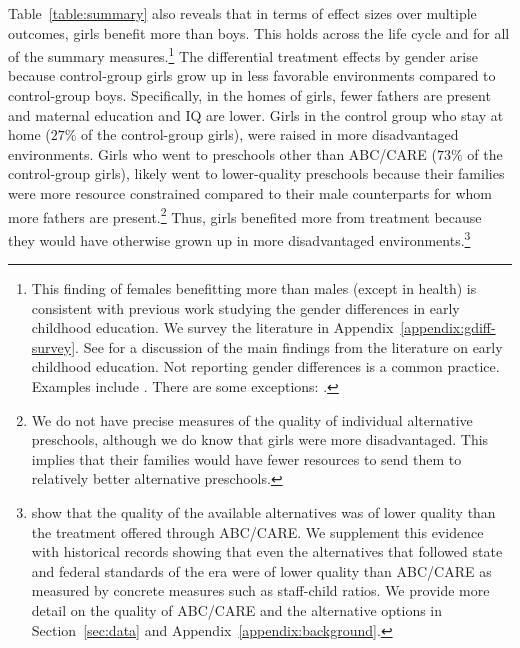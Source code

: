 Table~\ref{table:summary} also reveals that in terms of effect sizes over multiple outcomes, girls benefit more than boys. This holds across the life cycle and for all of the summary measures.\footnote{This finding of females benefitting more than males (except in health) is consistent with previous work studying the gender differences in early childhood education. We survey the literature in Appendix~\ref{appendix:gdiff-survey}. See \citet{Elango_Hojman_etal_2016_Early-Edu} for a discussion of the main findings from the literature on early childhood education. Not reporting gender differences is a common practice. Examples include \citet{Bernal_Keane_2011_JoLE,Cascio_Schanzenbach_2013_ImpactsExpandingAccess,Bitler_et_al_2014_Head_Start_Unpublished,Kline_Walters_2016_QJE}. There are some exceptions: \citet{Anderson_2008_JASA,Heckman_Moon_etal_2010_QE,Campbell_Conti_etal_2014_EarlyChildhoodInvestments,Garcia_Heckman_Leaf_etal_2017_Comp_CBA_Unpublished}.} The differential treatment effects by gender arise because control-group girls grow up in less favorable environments compared to control-group boys. Specifically, in the homes of girls, fewer fathers are present and maternal education and IQ are lower. Girls in the control group who stay at home ($27\%$ of the control-group girls), were raised in more disadvantaged environments. Girls who went to preschools other than ABC/CARE ($73\%$ of the control-group girls), likely went to lower-quality preschools because their families were more resource constrained compared to their male counterparts for whom more fathers are present.\footnote{We do not have precise measures of the quality of individual alternative preschools, although we do know that girls were more disadvantaged. This implies that their families would have fewer resources to send them to relatively better alternative preschools.} Thus, girls benefited more from treatment because they would have otherwise grown up in more disadvantaged environments.\footnote{\citet{Burchinal_etal_1989_CD_Daycare-Pre-K-Dev} show that the quality of the available alternatives was of lower quality than the treatment offered through ABC/CARE. We supplement this evidence with historical records showing that even the alternatives that followed state and federal standards of the era were of lower quality than ABC/CARE as measured by concrete measures such as staff-child ratios. We provide more detail on the quality of ABC/CARE and the alternative options in Section~\ref{sec:data} and Appendix~\ref{appendix:background}.}

